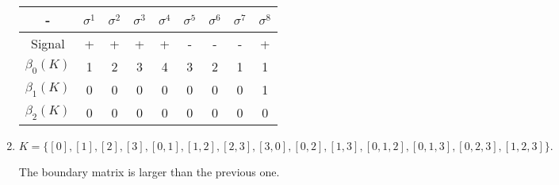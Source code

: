\begin{enumerate}
    \begin{center}
        \begin{tabular}{ c|c|c|c|c|c|c|c|c}
         - & $\sigma^1$ & $\sigma^2$ & $\sigma^3$ & $\sigma^4$ & $\sigma^5$ &
         $\sigma^6$ & $\sigma^7$ &$\sigma^8$ \\ 
         \hline
         Signal & + & + & + & + & - & - & - & + \\  
         $\beta_0(K)$ & 1 & 2 & 3 & 4 & 3 & 2 & 1 & 1 \\ 
         $\beta_1(K)$ & 0 & 0 & 0 & 0 & 0 & 0 & 0 & 1\\     
         $\beta_2(K)$ & 0 & 0 & 0 & 0 & 0 & 0 & 0 & 0\\     

        \end{tabular}
    \end{center}

    \item  $K = \{[0], [1], [2], [3], [0, 1], [1, 2], [2, 3], [3, 0], [0, 2], [1, 3], [0, 1, 2], [0, 1, 3], [0, 2, 3], [1, 2, 3]\}.
    $
    
    The boundary matrix is larger than the previous one. 


\end{enumerate}
